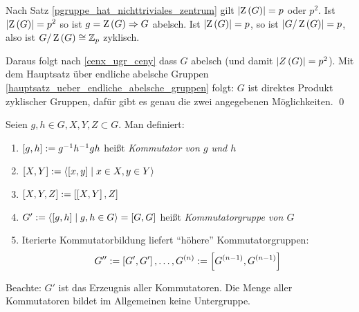 \begin{beweis}
 Nach Satz \ref{pgruppe_hat_nichttriviales_zentrum} gilt $\left|\operatorname{Z}\left(G\right)\right| = p$ oder $p^2$. Ist $\left|\operatorname{Z}\left(G\right)\right| = p^2$ so ist $g = \operatorname{Z}\left(G\right) \Rightarrow G$ abelsch. Ist $\left|\operatorname{Z}\left(G\right)\right|=p$, so ist $\left| G/\operatorname{Z}\left(G\right) \right| = p$, also ist $G/\operatorname{Z}\left(G\right) \cong \mathbb{Z}_p$ zyklisch.

 Daraus folgt nach \ref{cenx_ugr_ceny} dass $G$ abelsch (und damit $\left|Z\left(G\right)\right| = p^2$). Mit dem Hauptsatz \"uber endliche abelsche Gruppen \ref{hauptsatz_ueber_endliche_abelsche_gruppen} folgt: $G$ ist direktes Produkt zyklischer Gruppen, daf\"ur gibt es genau die zwei angegebenen M\"oglichkeiten.
 \qed
\end{beweis}

\begin{definition}[Kommutator]
\label{kommutator}
 Seien $g, h \in G, X, Y, Z \subset G$. Man definiert:
 \begin{enumerate}
  \item $\left[g, h\right] := g^{-1}h^{-1}gh$ hei\ss{}t \emph{Kommutator von $g$ und $h$}
  \item $\left[X, Y\right] := \left< \left[ x,y \right] \mid x\in X, y\in Y\right>$
  \item $\left[X,Y,Z\right] := \left[\left[X,Y\right],Z\right]$
  \item $G' := \left<\left[g,h\right] \mid g,h\in G\right> = \left[G,G\right]$ hei\ss{}t \emph{Kommutatorgruppe von $G$}
  \item Iterierte Kommutatorbildung liefert ``h\"ohere'' Kommutatorgruppen:
   \begin{equation*}
    G'' := \left[G', G'\right], \ldots, G^{\left(n\right)} := \left[G^{\left(n-1\right)},G^{\left(n-1\right)}\right]
   \end{equation*}
 \end{enumerate}
 Beachte: $G'$ ist das Erzeugnis aller Kommutatoren. Die Menge aller Kommutatoren bildet im Allgemeinen keine Untergruppe.
\end{definition}

